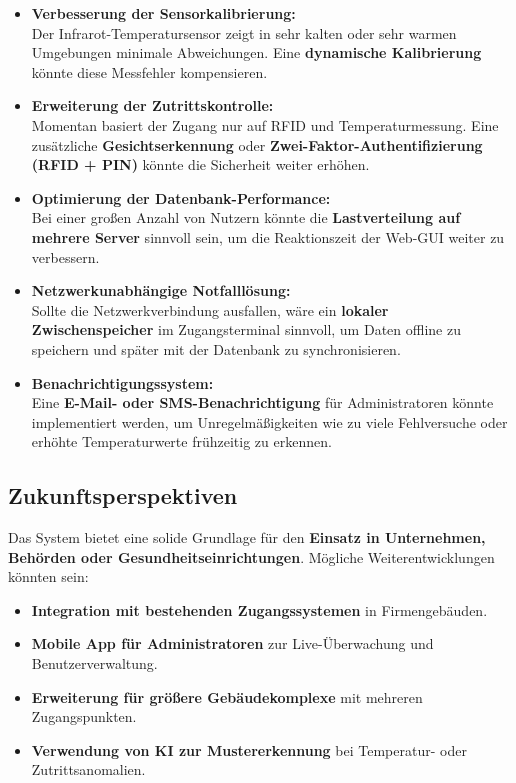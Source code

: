 \begin{itemize}
    \item \textbf{Verbesserung der Sensorkalibrierung:}\\
    Der Infrarot-Temperatursensor zeigt in sehr kalten oder sehr warmen Umgebungen minimale Abweichungen. Eine \textbf{dynamische Kalibrierung} könnte diese Messfehler kompensieren.
    \item \textbf{Erweiterung der Zutrittskontrolle:}\\
    Momentan basiert der Zugang nur auf RFID und Temperaturmessung. Eine zusätzliche \textbf{Gesichtserkennung} oder \textbf{Zwei-Faktor-Authentifizierung (RFID + PIN)} könnte die Sicherheit weiter erhöhen.
    \item \textbf{Optimierung der Datenbank-Performance:}\\
    Bei einer großen Anzahl von Nutzern könnte die \textbf{Lastverteilung auf mehrere Server} sinnvoll sein, um die Reaktionszeit der Web-GUI weiter zu verbessern.
    \item \textbf{Netzwerkunabhängige Notfalllösung:}\\
    Sollte die Netzwerkverbindung ausfallen, wäre ein \textbf{lokaler Zwischenspeicher} im Zugangsterminal sinnvoll, um Daten offline zu speichern und später mit der Datenbank zu synchronisieren.
    \item \textbf{Benachrichtigungssystem:}\\
    Eine \textbf{E-Mail- oder SMS-Benachrichtigung} für Administratoren könnte implementiert werden, um Unregelmäßigkeiten wie zu viele Fehlversuche oder erhöhte Temperaturwerte frühzeitig zu erkennen.
\end{itemize}

\subsection{Zukunftsperspektiven}


Das System bietet eine solide Grundlage für den \textbf{Einsatz in Unternehmen, Behörden oder Gesundheitseinrichtungen}. Mögliche Weiterentwicklungen könnten sein:

\begin{itemize}
    \item \textbf{Integration mit bestehenden Zugangssystemen} in Firmengebäuden.
    \item \textbf{Mobile App für Administratoren} zur Live-Überwachung und Benutzerverwaltung.
    \item \textbf{Erweiterung für größere Gebäudekomplexe} mit mehreren Zugangspunkten.
    \item \textbf{Verwendung von KI zur Mustererkennung} bei Temperatur- oder Zutrittsanomalien.
\end{itemize}

